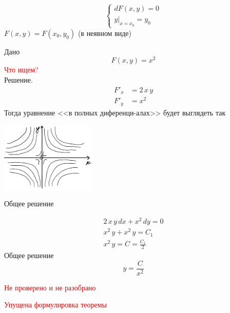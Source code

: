 \begin{Note}
    \[
        \begin{cases}
            dF(x,y)=0\\
            y|_{x=x_0}=y_0
        \end{cases}
    \]
    $F(x,y)=F(x_0,y_0)$ (в неявном виде)\\
\end{Note}

\begin{Example}
    Дано
    \[
        F(x,y)=x^2 
    \]
    \textcolor{red}{Что ищем?}\\
    Решение.
    \begin{align*}
        F'_x &=2\,x\,y\\
        F'_y &= x^2
    \end{align*}
    Тогда уравнение <<в полных диференци-алах>> будет выглядеть так
    \begin{floatingfigure}[l]{50mm}
        \noindent
        \hfil
        \includegraphics[width=45mm]{2_5_1.png}
        \caption{Общее решение}
        \hfil
    \end{floatingfigure}
    \begin{gather*}
        2\,x\,y\,dx+x^2\,dy = 0\\
        x^2\,y + x^2\,y = C_1\\
        x^2\,y = C = \frac{C_1}{2}
    \end{gather*}
    Общее решение
    \[
        y=\frac{C}{x^2}
    \]
\end{Example}

\textcolor{red}{Не проверено и не разобрано}

\begin{Th}
    \textcolor{red}{Упущена формулировка теоремы}
\end{Th}

